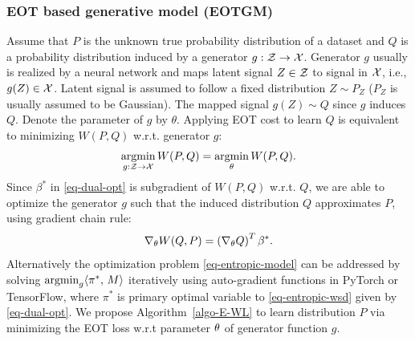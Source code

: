 \subsubsection{EOT based generative model (EOTGM)}\label{subsec-gmeot}
{Assume that $P$ is the unknown true probability distribution of a dataset and $Q$ is a probability distribution induced by a generator $g: \mathcal{Z} \rightarrow \mathcal{X}$. Generator $g$ usually is realized by a neural network and maps latent signal $Z \in \mathcal{Z}$ to signal in $\mathcal{X}$, i.e., $g(Z) \in \mathcal{X}$. Latent signal is assumed to follow a fixed distribution $Z \sim P_Z$ ($P_Z$ is usually assumed to be Gaussian). The mapped signal $g(Z) \sim Q$ since $g$ induces $Q$. Denote the parameter of $g$ by $\theta$. Applying EOT cost to learn $Q$ is equivalent to minimizing $W(P, Q)$ w.r.t. generator $g$}:\vspace{-2pt}
\begin{equation}\label{eq-entropic-model}
  \underset{g:\mathcal{Z}\to \Xx}{\argmin}\, W(P, Q) = \underset{{\theta}}{\argmin}\, W(P, Q).\vspace{-2pt}
\end{equation}
Since $\beta^{\ast}$ in
\eqref{eq-dual-opt} is subgradient of $W(P, Q)$ w.r.t. $Q$, we are able to
optimize the generator $g$ such that the induced distribution $Q$
approximates $P$, using gradient chain rule:\vspace{-2pt}
\begin{equation}
  \nabla_{\theta}W(Q, P) = \left(\nabla_{\theta}Q\right)^{T}
  \beta^{\ast}.\vspace{-2pt}
\end{equation}
Alternatively the optimization problem \eqref{eq-entropic-model} can be addressed by solving $\operatorname{argmin}_{g}\langle \pi^{\ast},\,M\rangle $ iteratively using auto-gradient functions in PyTorch\cite{pytorch} or
TensorFlow\cite{tensorflow}, where $\pi^{\ast}$ is primary optimal
variable to \eqref{eq-entropic-wsd} given by \eqref{eq-dual-opt}. We
propose Algorithm~\ref{algo-E-WL} to learn distribution $P$
via minimizing the EOT loss w.r.t parameter $\theta$
of generator function $g$.
